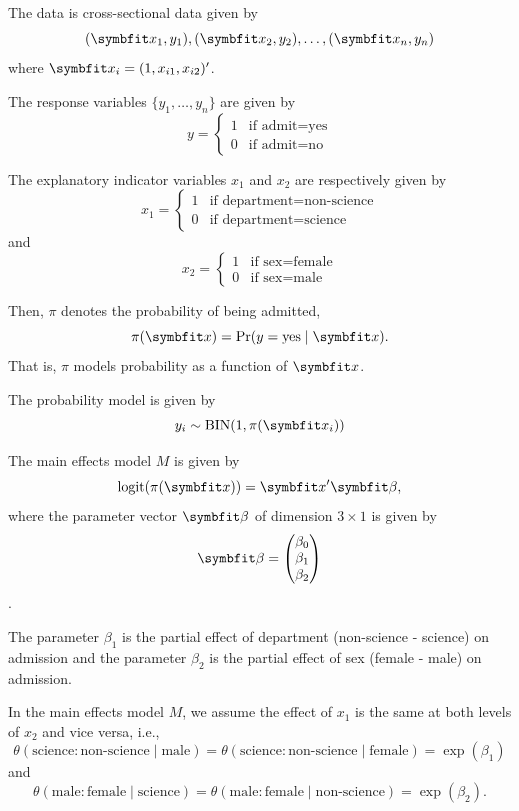 \documentclass[
  11pt,
]{article}
\begin{document}

The data is cross-sectional data given by \[
    (\v{x_1},y_1),(\v{x_2},y_2),\ldots,(\v{x_n},y_n)
\] where \(\v{x_i} = (1,x_{i 1},x_{i 2})'\).

The response variables \(\{y_1,\ldots,y_n\}\) are given by \[
  y =
  \begin{cases}
    1 & \text{if admit=yes}\\
    0 & \text{if admit=no}
  \end{cases}
\]

The explanatory indicator variables \(x_1\) and \(x_2\) are respectively
given by \[
  x_1 =
  \begin{cases}
    1 & \text{if department=non-science}\\
    0 & \text{if department=science}
  \end{cases}
\] and \[
  x_2 =
  \begin{cases}
    1 & \text{if sex=female}\\
    0 & \text{if sex=male}
  \end{cases}
\]

Then, \(\pi\) denotes the probability of being admitted, \[
  \pi(\v{x}) = \Pr(y = \text{yes} \;|\; \v{x}).
\] That is, \(\pi\) models probability as a function of \(\v{x}\).

The probability model is given by \[
  y_i \sim \operatorname{BIN}(1,\pi(\v{x_i}))
\]

The main effects model \(M\) is given by \[
  \operatorname{logit}(\pi(\v{x})) = \v{x}' \v{\beta},
\] where the parameter vector \(\v{\beta}\) of dimension \(3 \times 1\)
is given by \[
\v{\beta} =
\begin{pmatrix}
  \beta_0\\
  \beta_1\\
  \beta_2
\end{pmatrix}
\].

The parameter \(\beta_1\) is the partial effect of department
(non-science - science) on admission and the parameter \(\beta_2\) is
the partial effect of sex (female - male) on admission.

In the main effects model \(M\), we assume the effect of \(x_1\) is the
same at both levels of \(x_2\) and vice versa, i.e., \[
  \theta(\text{science}:\text{non-science} \;|\; \text{male}) = \theta(\text{science}:\text{non-science} \; | \;\text{female}) = \exp(\beta_1)
\] and \[
  \theta(\text{male}:\text{female} \;|\; \text{science}) = \theta(\text{male}:\text{female} \; | \; \text{non-science}) = \exp(\beta_2).
\]
\end{document}
